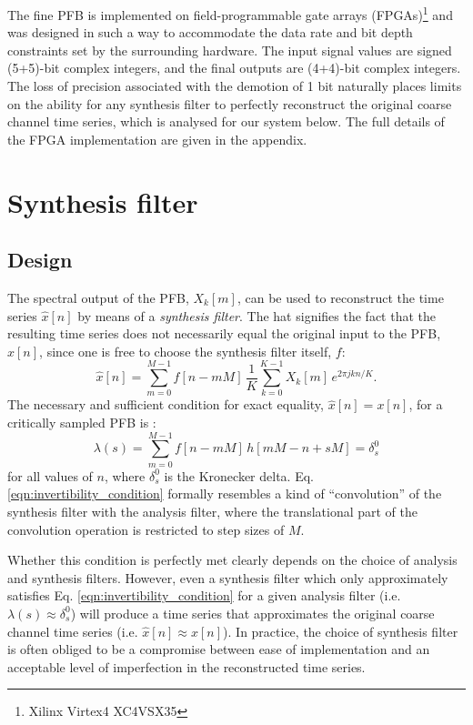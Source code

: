 \documentclass{pasa}%
\newcommand{\Kron}{\delta_s^0}
\begin{document}
The fine PFB is implemented on field-programmable gate arrays (FPGAs)\footnote{Xilinx Virtex4 XC4VSX35} and was designed in such a way to accommodate the data rate and bit depth constraints set by the surrounding hardware.
The input signal values are signed (5+5)-bit complex integers, and the final outputs are (4+4)-bit complex integers.
The loss of precision associated with the demotion of 1 bit naturally places limits on the ability for any synthesis filter to perfectly reconstruct the original coarse channel time series, which is analysed for our system below.
The full details of the FPGA implementation are given in the appendix.

\section{Synthesis filter}
\label{sec:ipfb}

\subsection{Design}

The spectral output of the PFB, $X_k[m]$, can be used to reconstruct the time series $\hat{x}[n]$ by means of a \textit{synthesis filter}.
The hat signifies the fact that the resulting time series does not necessarily equal the original input to the PFB, $x[n]$, since one is free to choose the synthesis filter itself, $f$:
\begin{equation}
    \hat{x}[n] = \sum_{m = 0}^{M-1} f[n - mM]\,
        \frac{1}{K} \sum_{k=0}^{K-1} X_k[m]\,e^{2\pi jkn/K}.
    \label{eqn:ipfb}
\end{equation}
The necessary and sufficient condition for exact equality, $\hat{x}[n] = x[n]$, for a critically sampled PFB is \citep[proven in][]{Crochiere1983}:
\begin{equation}
    \lambda(s) = \sum_{m=0}^{M-1} f[n-mM]\,h[mM - n + sM] = \Kron
    \label{eqn:invertibility_condition}
\end{equation}
for all values of $n$, where $\Kron$ is the Kronecker delta.
Eq. \eqref{eqn:invertibility_condition} formally resembles a kind of ``convolution'' of the synthesis filter with the analysis filter, where the translational part of the convolution operation is restricted to step sizes of $M$.

Whether this condition is perfectly met clearly depends on the choice of analysis and synthesis filters.
However, even a synthesis filter which only approximately satisfies Eq. \eqref{eqn:invertibility_condition} for a given analysis filter (i.e. $\lambda(s) \approx \Kron$) will produce a time series that approximates the original coarse channel time series (i.e. $\hat{x}[n] \approx x[n]$).
In practice, the choice of synthesis filter is often obliged to be a compromise between ease of implementation and an acceptable level of imperfection in the reconstructed time series.
\end{document}
